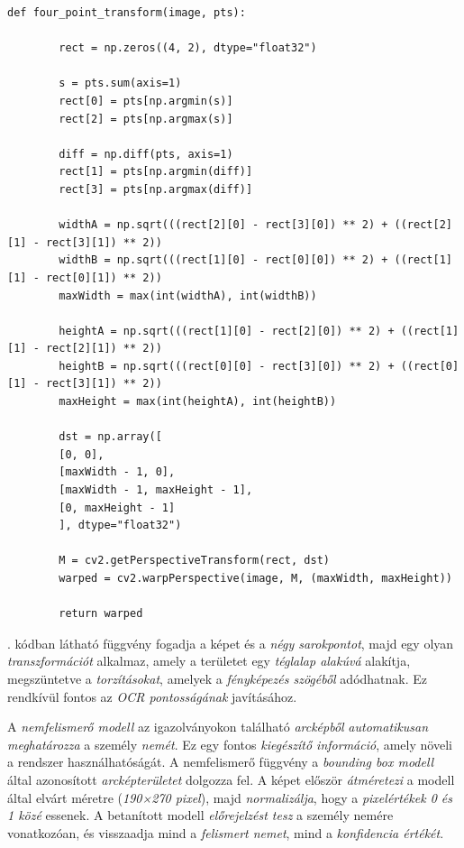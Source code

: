 \documentclass[
]{thesis-ekf}
\theoremstyle{definition}
\theoremstyle{remark}
\begin{document}
\begin{lstlisting}[style=mypython, caption=Határoló dobozzal határolt kép transzformációja, label=kod-python8]
	def four_point_transform(image, pts):

		rect = np.zeros((4, 2), dtype="float32")
	
		s = pts.sum(axis=1)
		rect[0] = pts[np.argmin(s)]
		rect[2] = pts[np.argmax(s)]
	
		diff = np.diff(pts, axis=1)
		rect[1] = pts[np.argmin(diff)]
		rect[3] = pts[np.argmax(diff)]
		
		widthA = np.sqrt(((rect[2][0] - rect[3][0]) ** 2) + ((rect[2][1] - rect[3][1]) ** 2))
		widthB = np.sqrt(((rect[1][0] - rect[0][0]) ** 2) + ((rect[1][1] - rect[0][1]) ** 2))
		maxWidth = max(int(widthA), int(widthB))
		
		heightA = np.sqrt(((rect[1][0] - rect[2][0]) ** 2) + ((rect[1][1] - rect[2][1]) ** 2))
		heightB = np.sqrt(((rect[0][0] - rect[3][0]) ** 2) + ((rect[0][1] - rect[3][1]) ** 2))
		maxHeight = max(int(heightA), int(heightB))
		
		dst = np.array([
		[0, 0],
		[maxWidth - 1, 0],
		[maxWidth - 1, maxHeight - 1],
		[0, maxHeight - 1]
		], dtype="float32")
		
		M = cv2.getPerspectiveTransform(rect, dst)
		warped = cv2.warpPerspective(image, M, (maxWidth, maxHeight))
		
		return warped
\end{lstlisting}

. kódban látható függvény fogadja a képet és a \emph{négy sarokpontot}, majd egy olyan \emph{transzformációt} alkalmaz, amely a területet egy \emph{téglalap alakúvá} alakítja, megszüntetve a \emph{torzításokat}, amelyek a \emph{fényképezés szögéből} adódhatnak. Ez rendkívül fontos az \emph{OCR pontosságának} javításához.

A \emph{nemfelismerő modell} az igazolványokon található \emph{arcképből} \emph{automatikusan meghatározza} a személy \emph{nemét}. Ez egy fontos \emph{kiegészítő információ}, amely növeli a rendszer használhatóságát. A nemfelismerő függvény a \emph{bounding box modell} által azonosított \emph{arcképterületet} dolgozza fel. A képet először \emph{átméretezi} a modell által elvárt méretre (\emph{190×270 pixel}), majd \emph{normalizálja}, hogy a \emph{pixelértékek 0 és 1 közé} essenek. A betanított modell \emph{előrejelzést tesz} a személy nemére vonatkozóan, és visszaadja mind a \emph{felismert nemet}, mind a \emph{konfidencia értékét}.
\end{document}
